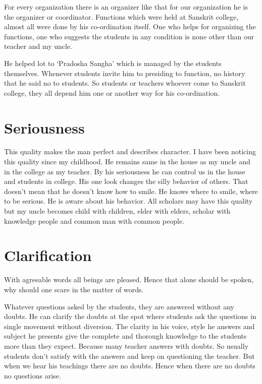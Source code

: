 For every organization there is an organizer like that for our organization he is the organizer or coordinator. Functions which were held at Sanskrit college, almost all were done by his co-ordination itself. One who helps for organizing the functions, one who suggests the students in any condition is none other than our teacher and my uncle.

He helped lot to ‘Pradosha Sangha’ which is managed by the students themselves. Whenever students invite him to presiding to function, no history that he said no to students. So students or teachers whoever come to Sanskrit college, they all depend him one or another way for his co-ordination.
 
\section{Seriousness {\normalsize{}}}

This quality makes the man perfect and describes character. I have been noticing this quality since my childhood. He remains same in the house as my uncle and in the college as my teacher. By his seriousness he can control us in the house and students in college. His one look changes the silly behavior of others. That doesn’t mean that he doesn’t know how to smile. He knows where to smile, where to be serious. He is aware about his behavior. All scholars may have this quality but my uncle becomes child with children, elder with elders, scholar with knowledge people and common man with common people.

\section{Clarification {\normalsize{}}}

\begin{verse}
\end{verse}
With agreeable words all beings are pleased. Hence that alone should be spoken, why should one scare in the matter of words.

Whatever questions asked by the students, they are answered without any doubts. He can clarify the doubts at the spot where students ask the questions in single movement without diversion. The clarity in his voice, style he answers and subject he presents give the complete and thorough knowledge to the students more than they expect. Because many teacher answers with doubts. So usually students don’t satisfy with the answers and keep on questioning the teacher. But when we hear his teachings there are no doubts. Hence when there are no doubts no questions arise.

